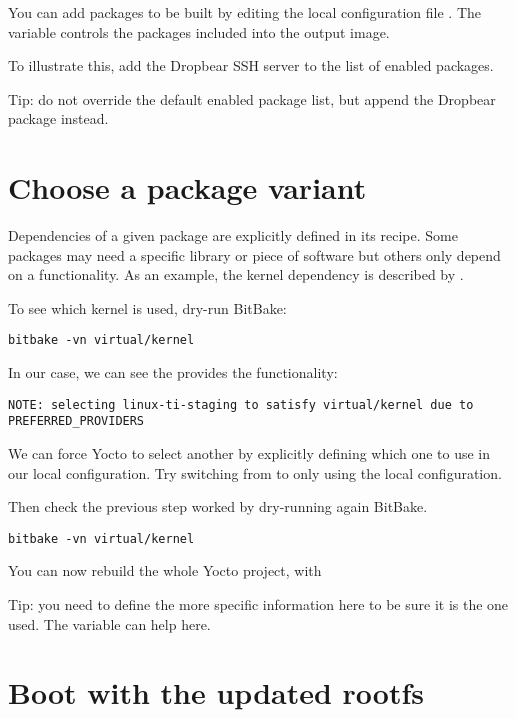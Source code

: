 You can add packages to be built by editing the local configuration file
. The  variable controls the
packages included into the output image.

To illustrate this, add the Dropbear SSH server to the list of enabled
packages.

Tip: do not override the default enabled package list, but append the Dropbear
package instead.

\section{Choose a package variant}

Dependencies of a given package are explicitly defined in its recipe.
Some packages may need a specific library or piece of software but
others only depend on a functionality. As an example, the kernel
dependency is described by .

To see which kernel is used, dry-run BitBake:
\begin{verbatim}
bitbake -vn virtual/kernel
\end{verbatim}

In our case, we can see the  provides the
 functionality:
\small
\begin{verbatim}
NOTE: selecting linux-ti-staging to satisfy virtual/kernel due to PREFERRED_PROVIDERS
\end{verbatim}
\normalsize

We can force Yocto to select another  by explicitly
defining which one to use in our local configuration. Try switching
from  to  only using the
local configuration.

Then check the previous step worked by dry-running again BitBake.
\begin{verbatim}
bitbake -vn virtual/kernel
\end{verbatim}

You can now rebuild the whole Yocto project, with 

Tip: you need to define the more specific information here to be sure it is the
one used. The  variable can help here.

\section{Boot with the updated rootfs}

